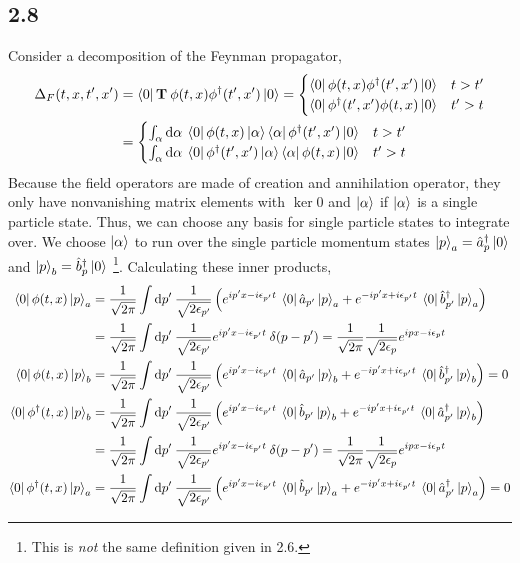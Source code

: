 \documentclass[12pt]{extarticle}
\begin{document}
\subsection*{2.8}
Consider a decomposition of the Feynman propagator,
\begin{align*}
\Delta_F(t, x, t', x') & = \left< 0 \right| \mathbf{T} \: \phi(t, x) \phi^\dagger(t', x') \left| 0 \right> = 
\begin{cases}
\left< 0 \right| \phi(t, x) \phi^\dagger(t', x') \left| 0 \right> & t > t' \\
\left< 0 \right| \phi^\dagger(t', x') \phi(t, x) \left| 0 \right> & t' > t
\end{cases}
\\
& = \begin{cases}
\int_\alpha \mathrm{d}\alpha \: \left< 0 \right| \phi(t, x) \left| \alpha \right> \left< \alpha \right| \phi^\dagger(t', x') \left| 0 \right> & t > t' \\
\int_\alpha \mathrm{d}\alpha \: \left< 0 \right| \phi^\dagger(t', x') \left| \alpha \right> \left< \alpha \right| \phi(t, x) \left| 0 \right> & t' > t
\end{cases}
\end{align*}
Because the field operators are made of creation and annihilation operator, they  only have nonvanishing matrix elements with $\ker{0}$ and $\left| \alpha \right>$ if $\left| \alpha \right>$ is a single particle state. Thus, we can choose any basis for single particle states to integrate over. We choose $\left| \alpha \right>$ to run over the single particle momentum states $\left| p \right>_a = \hat{a}^\dagger_p \left| 0 \right>$ and $\left| p \right>_b = \hat{b}^\dagger_p \left| 0 \right>$ \footnote{This is \textit{not} the same definition given in 2.6.}. Calculating these inner products,
\begin{align*}
\left< 0 \right| \phi(t, x) \left| p \right>_a & = \frac{1}{\sqrt{2 \pi}} \int \mathrm{d}p' \: \frac{1}{\sqrt{2 \epsilon_{p'}}} \left( e^{i p' x - i \epsilon_{p'} t} \: \left< 0 \right| \hat{a}_{p'} \left| p \right>_a + e^{- i p' x + i \epsilon_{p'} t} \: \left< 0 \right| \hat{b}^\dagger_{p'} \left| p \right>_a \right)
\\
& = \frac{1}{\sqrt{2 \pi}} \int \mathrm{d}p' \: \frac{1}{\sqrt{2 \epsilon_{p'}}} e^{i p' x - i \epsilon_{p'} t} \: \delta(p - p') = \frac{1}{\sqrt{2 \pi}}  \frac{1}{\sqrt{2 \epsilon_{p}}} e^{i p x - i \epsilon_{p} t}
\\
\left< 0 \right| \phi(t, x) \left| p \right>_b & = \frac{1}{\sqrt{2 \pi}} \int \mathrm{d}p' \: \frac{1}{\sqrt{2 \epsilon_{p'}}} \left( e^{i p' x - i \epsilon_{p'} t} \: \left< 0 \right| \hat{a}_{p'} \left| p \right>_b + e^{- i p' x + i \epsilon_{p'} t} \: \left< 0 \right| \hat{b}^\dagger_{p'} \left| p \right>_b \right) = 0
\\
\left< 0 \right| \phi^\dagger(t, x) \left| p \right>_b & = \frac{1}{\sqrt{2 \pi}} \int \mathrm{d}p' \: \frac{1}{\sqrt{2 \epsilon_{p'}}} \left( e^{i p' x - i \epsilon_{p'} t} \: \left< 0 \right| \hat{b}_{p'} \left| p \right>_b + e^{- i p' x + i \epsilon_{p'} t} \: \left< 0 \right| \hat{a}^\dagger_{p'} \left| p \right>_b \right)
\\
& = \frac{1}{\sqrt{2 \pi}} \int \mathrm{d}p' \: \frac{1}{\sqrt{2 \epsilon_{p'}}} e^{i p' x - i \epsilon_{p'} t} \: \delta(p - p') = \frac{1}{\sqrt{2 \pi}}  \frac{1}{\sqrt{2 \epsilon_{p}}} e^{i p x - i \epsilon_{p} t}
\\
\left< 0 \right| \phi^\dagger(t, x) \left| p \right>_a & = \frac{1}{\sqrt{2 \pi}} \int \mathrm{d}p' \: \frac{1}{\sqrt{2 \epsilon_{p'}}} \left( e^{i p' x - i \epsilon_{p'} t} \: \left< 0 \right| \hat{b}_{p'} \left| p \right>_a + e^{- i p' x + i \epsilon_{p'} t} \: \left< 0 \right| \hat{a}^\dagger_{p'} \left| p \right>_a \right) = 0
\end{align*}  
\end{document}
